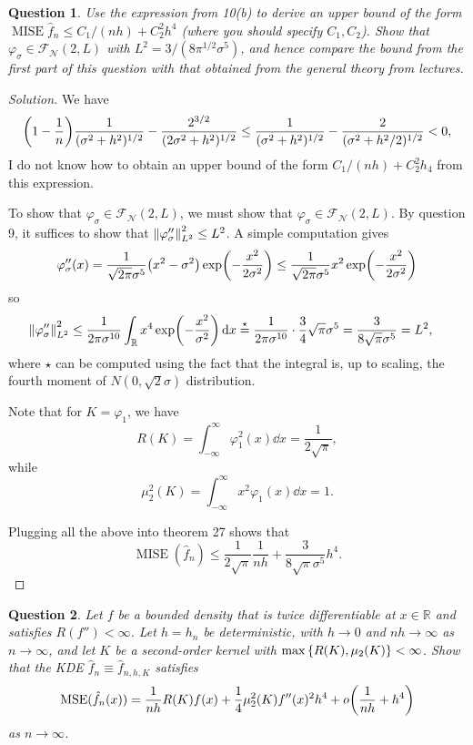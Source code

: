 \documentclass{article}
\theoremstyle{plain}
\newtheorem{question}{Question}
\theoremstyle{remark}
\newenvironment{solution}{\begin{proof}[Solution]\renewcommand\qedsymbol{}}{\end{proof}}
\renewcommand{\phi}{\varphi}
\newcommand{\Bb}{\mathbb}
\newcommand{\Cal}{\mathcal}
\newcommand{\RR}{\Bb R}
\newcommand\FF{\Cal F}
\newcommand\Nn{\Cal N}
\DeclareMathOperator\MSE{MSE}
\DeclareMathOperator\MISE{MISE}
\begin{document}
\begin{question}
	Use the expression from 10(b) to derive an upper bound of the form $\MISE \hat f_n \leq C_1/(nh) + C_2^2 h^4$ (where you should specify $C_1, C_2$). Show that $\phi_\sigma \in \FF_\Nn(2, L)$ with $L^2 = 3/(8 \pi^{1/2} \sigma^5)$, and hence compare the bound from the first part of this question with that obtained from the general theory from lectures. 
\end{question}

\begin{solution}
	We have 
	\[
	\qty(1 - \frac1n) \frac{1}{(\sigma^2 + h^2)^{1/2}} - \frac{2^{3/2}}{(2\sigma^2 + h^2)^{1/2}} \leq \frac{1}{(\sigma^2 + h^2)^{1/2}}  - \frac{2}{(\sigma^2 + h^2/2)^{1/2}} < 0,
	\]
	I do not know how to obtain an upper bound of the form $C_1/(nh) + C_2^2 h_4$ from this expression. 
	
	To show that $\phi_\sigma \in \FF_\Nn(2, L)$,  we must show that $\phi_\sigma \in \FF_\Nn(2, L)$. By question 9, it suffices to show that $\norm{\phi''_\sigma}_{L^2}^2 \leq L^2$. 
	A simple computation gives
	\[
	\phi_\sigma''(x) = \frac{1}{\sqrt{2\pi} \sigma^5} \qty(x^2 - \sigma^2) \exp(-\frac{x^2}{2\sigma^2}) \leq \frac1{\sqrt{2\pi} \sigma^5} x^2 \exp(-\frac{x^2}{2\sigma^2})
	\]
	so
	\begin{align*}
	\norm{\phi_\sigma''}_{L^2}^2 &\leq \frac{1}{2\pi\sigma^{10}} \int_\RR x^4 \exp(-\frac{x^2}{\sigma^2}) \dd{x} \overset\star= \frac{1}{2\pi \sigma^{10}} \cdot \frac34 \sqrt{\pi} \sigma^5 = \frac{3}{8 \sqrt\pi \sigma^5} = L^2, 
	\end{align*}
where $\star$ can be computed using the fact that the integral is, up to scaling, the fourth moment of $N(0, \sqrt2\sigma)$ distribution. 

Note that for $K = \phi_1$, we have 
\[
R(K) = \int_{-\infty}^\infty \phi_1^2(x) \dd{x} = \frac1{2\sqrt\pi}, 
\]
while
\[
\mu_2^2(K)=  \int_{-\infty}^\infty x^2 \phi_1(x) \dd{x} = 1.
\]

Plugging all the above into theorem 27 shows that 
\[
\MISE(\hat f_n) \leq \frac{1}{2\sqrt\pi} \frac1{nh} + \frac{3}{8\sqrt\pi \sigma^5} h^4.
\]
\end{solution}

\begin{question}
	Let $f$ be a bounded density that is twice differentiable at $x \in \RR$ and satisfies $R(f'') < \infty$. Let $h = h_n$ be deterministic, with $h \to 0$ and $nh \to \infty$ as $n\to\infty$, and let $K$ be a second-order kernel with $\max\qty{R(K), \mu_2(K)} < \infty$. Show that the KDE $\hat f_n \equiv \hat f_{n, h, K}$ satisfies
	\[
	\MSE (\hat f_n(x)) = \frac1{nh} R(K) f(x) + \frac14 \mu_2^2(K) f''(x)^2 h^4 + o\qty(\frac1{nh} + h^4)
	\]
	as $n\to\infty$. 
\end{question}
\end{document}
